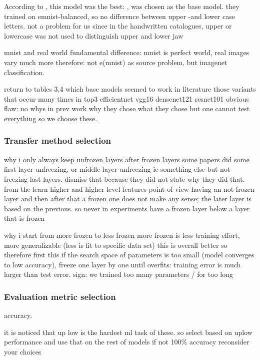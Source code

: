 \documentclass{article}
\begin{document}
According to \cite{emnistclassifiersurvey}, this model was the best: \cite{jamilemnist}, was chosen as the base model.
they trained on emnist-balanced, so no difference between upper -and lower case letters. not a problem for us since 
in the handwritten catalogues, upper or lowercase was not used to distinguish upper and lower jaw

mnist and real world fundamental difference: mnist is perfect world, real images vary much more \cite{alexnet}
therefore: not e(mnist) as source problem, but imagenet classification.

return to tables 3,4 which base models seemed to work in literature
those variants that occur many times in top3
efficientnet
vgg16
densenet121
resnet101
obvious flaw: no whys in prev work why they chose what they chose but 
one cannot test everything so we choose these.

\subsubsection{Transfer method selection}

why i only always keep unfrozen layers after frozen layers
some papers did some first layer unfreezing, or middle layer unfreezing ie something else 
but not freezing last layers. dismiss that because 
they did not state why they did that. from the learn higher and higher level features point of view 
having an not frozen layer and then after that a frozen one does not make any sense; the later 
layer is based on the previous. so never in experiments have a frozen layer below a layer that is frozen

why i start from more frozen to less frozen
more frozen is less training effort, more generalizable (less is fit to specific data set)
this is overall better so therefore first this
if the search space of parameters is too small (model converges to low accuracy), freeze one layer by one 
until overfits: training error is much larger than test error. sign: we trained too many parameters / for too long

\subsubsection{Evaluation metric selection}

accuracy.

it is noticed that up low is the hardest ml task of these. so select based on uplow performance and use that on the rest of models
if not 100\% accuracy reconsider your choices
\end{document}
